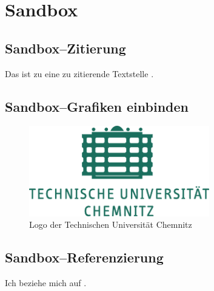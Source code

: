 \section{Sandbox}

\subsection{Sandbox--Zitierung}

Das ist zu eine zu zitierende Textstelle \cite{Klocke.2008}.

\subsection{Sandbox--Grafiken einbinden}

\begin{figure}[htbp] 
  \centering
     \includegraphics[width=0.7\textwidth]{img/logo_tuc.pdf}
  \caption{Logo der Technischen Universität Chemnitz}
  \label{fig:Bild1}
\end{figure}

\newpage

\newpage


\subsection{Sandbox--Referenzierung}

Ich beziehe mich auf .












